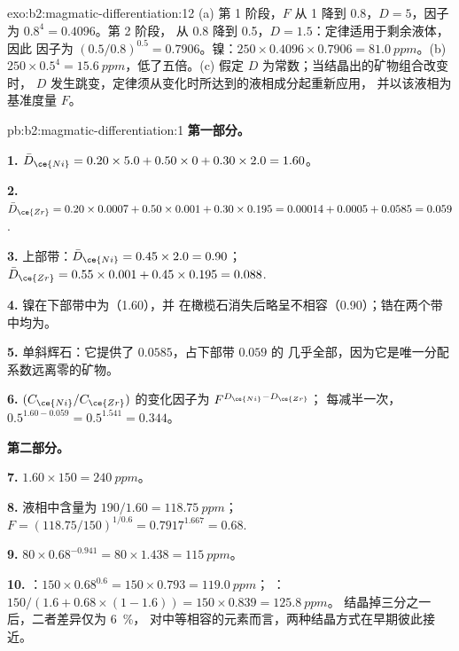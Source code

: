 \begin{solution}{exo:b2:magmatic-differentiation:12}
(a) 第 1 阶段，$F$ 从 1 降到 0.8，$D = 5$，因子为 $0.8^{4} = 0.4096$。第 2 阶段，
从 0.8 降到 0.5，$D = 1.5$：定律适用于剩余液体，因此
因子为 $(0.5/0.8)^{0.5} = 0.7906$。镍：$250\times0.4096\times0.7906 =
\qty{81.0}{ppm}$。(b) $250\times0.5^{4} = \qty{15.6}{ppm}$，低了五倍。(c)
假定 $D$ 为常数；当结晶出的矿物组合改变时，
$D$ 发生跳变，定律须从变化时所达到的液相成分起重新应用，
并以该液相为基准度量 $F$。
\end{solution}

\begin{solution}{pb:b2:magmatic-differentiation:1}
\noindent\textbf{第一部分。}

\textbf{1.} $\bar D_{\ce{Ni}} = 0.20\times5.0 + 0.50\times0 + 0.30\times2.0 = 1.60$。

\textbf{2.} $\bar D_{\ce{Zr}} = 0.20\times0.0007 + 0.50\times0.001 + 0.30\times0.195 =
0.00014 + 0.0005 + 0.0585 = 0.059$.

\textbf{3.} 上部带：$\bar D_{\ce{Ni}} = 0.45\times2.0 = 0.90$；$\bar D_{\ce{Zr}} =
0.55\times0.001 + 0.45\times0.195 = 0.088$.

\textbf{4.} 镍在下部带中为（1.60），并
在橄榄石消失后略呈不相容（0.90）；锆在两个带中均为。

\textbf{5.} 单斜辉石：它提供了 $0.0585$，占下部带 $0.059$ 的
几乎全部，因为它是唯一分配系数远离零的矿物。

\textbf{6.} $(C_{\ce{Ni}}/C_{\ce{Zr}})$ 的变化因子为 $F^{D_{\ce{Ni}} - D_{\ce{Zr}}}$；
每减半一次，$0.5^{1.60 - 0.059} = 0.5^{1.541} = 0.344$。

\noindent\textbf{第二部分。}

\textbf{7.} $1.60\times150 = \qty{240}{ppm}$。

\textbf{8.} 液相中含量为 $190/1.60 = \qty{118.75}{ppm}$；$F = (118.75/150)^{1/0.6} =
0.7917^{1.667} = 0.68$.

\textbf{9.} $80\times0.68^{-0.941} = 80\times1.438 = \qty{115}{ppm}$。

\textbf{10.} ：$150\times0.68^{0.6} = 150\times0.793 = \qty{119.0}{ppm}$；
：$150/(1.6 + 0.68\times(1 - 1.6)) = 150\times0.839 = \qty{125.8}{ppm}$。
结晶掉三分之一后，二者差异仅为 \qty{6}{\percent}，
对中等相容的元素而言，两种结晶方式在早期彼此接近。


\end{solution}
